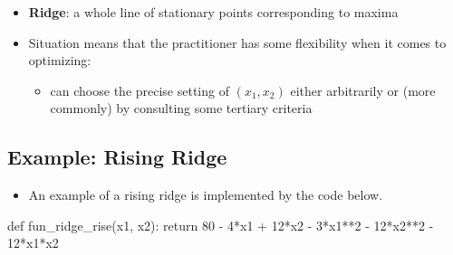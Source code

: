\documentclass[
  letterpaper,
  DIV=11,
  numbers=noendperiod]{scrreprt}
\newenvironment{Shaded}{\begin{snugshade}}{\end{snugshade}}
\newcommand{\ControlFlowTok}[1]{\textcolor[rgb]{0.00,0.23,0.31}{#1}}
\newcommand{\DecValTok}[1]{\textcolor[rgb]{0.68,0.00,0.00}{#1}}
\newcommand{\KeywordTok}[1]{\textcolor[rgb]{0.00,0.23,0.31}{#1}}
\newcommand{\NormalTok}[1]{\textcolor[rgb]{0.00,0.23,0.31}{#1}}
\newcommand{\OperatorTok}[1]{\textcolor[rgb]{0.37,0.37,0.37}{#1}}
\providecommand{\tightlist}{%
  \setlength{\itemsep}{0pt}\setlength{\parskip}{0pt}}\usepackage{longtable,booktabs,array}
\begin{document}
\begin{itemize}
\tightlist
\item
  \textbf{Ridge}: a whole line of stationary points corresponding to
  maxima
\item
  Situation means that the practitioner has some flexibility when it
  comes to optimizing:

  \begin{itemize}
  \tightlist
  \item
    can choose the precise setting of \((x_1, x_2)\) either arbitrarily
    or (more commonly) by consulting some tertiary criteria
  \end{itemize}
\end{itemize}

\subsection{Example: Rising Ridge}\label{example-rising-ridge}

\begin{itemize}
\tightlist
\item
  An example of a rising ridge is implemented by the code below.
\end{itemize}

\begin{Shaded}
\begin{Highlighting}[]
\KeywordTok{def}\NormalTok{ fun\_ridge\_rise(x1, x2):}
     \ControlFlowTok{return} \DecValTok{80} \OperatorTok{{-}} \DecValTok{4}\OperatorTok{*}\NormalTok{x1 }\OperatorTok{+} \DecValTok{12}\OperatorTok{*}\NormalTok{x2 }\OperatorTok{{-}} \DecValTok{3}\OperatorTok{*}\NormalTok{x1}\OperatorTok{**}\DecValTok{2} \OperatorTok{{-}} \DecValTok{12}\OperatorTok{*}\NormalTok{x2}\OperatorTok{**}\DecValTok{2} \OperatorTok{{-}} \DecValTok{12}\OperatorTok{*}\NormalTok{x1}\OperatorTok{*}\NormalTok{x2}
\end{Highlighting}
\end{Shaded}
\end{document}
